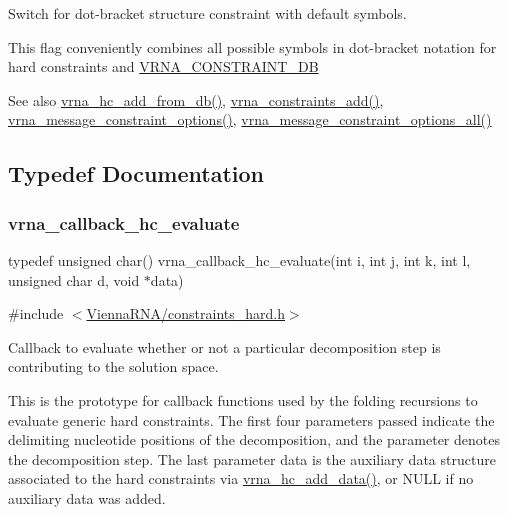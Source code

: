 Switch for dot-\/bracket structure constraint with default symbols. 

This flag conveniently combines all possible symbols in dot-\/bracket notation for hard constraints and \hyperlink{group__hard__constraints_ga4bfc2f15c4f261c62a11af9d2aa80c90}{V\+R\+N\+A\+\_\+\+C\+O\+N\+S\+T\+R\+A\+I\+N\+T\+\_\+\+DB}

\begin{DoxySeeAlso}{See also}
\hyperlink{group__hard__constraints_ga5b4de3247b67358080c176b94591a8e6}{vrna\+\_\+hc\+\_\+add\+\_\+from\+\_\+db()}, \hyperlink{group__constraints_ga35a401f680969a556858a8dd5f1d07cc}{vrna\+\_\+constraints\+\_\+add()}, \hyperlink{group__constraints_gaa1f20b53bf09ac2e6b0dbb13f7d89670}{vrna\+\_\+message\+\_\+constraint\+\_\+options()}, \hyperlink{group__constraints_gaec7e13fa0465c2acc7a621d1aecb709f}{vrna\+\_\+message\+\_\+constraint\+\_\+options\+\_\+all()} 
\end{DoxySeeAlso}


\subsection{Typedef Documentation}
\mbox{\label{group__hard__constraints_gae465f1d4a3d8b6592b38ecbb0d9f613d}} 
\subsubsection{\texorpdfstring{vrna\+\_\+callback\+\_\+hc\+\_\+evaluate}{vrna\_callback\_hc\_evaluate}}
{\footnotesize\ttfamily typedef unsigned char() vrna\+\_\+callback\+\_\+hc\+\_\+evaluate(int i, int j, int k, int l, unsigned char d, void $\ast$data)}



{\ttfamily \#include $<$\hyperlink{constraints__hard_8h}{Vienna\+R\+N\+A/constraints\+\_\+hard.\+h}$>$}



Callback to evaluate whether or not a particular decomposition step is contributing to the solution space. 

This is the prototype for callback functions used by the folding recursions to evaluate generic hard constraints. The first four parameters passed indicate the delimiting nucleotide positions of the decomposition, and the parameter {\ttfamily denotes} the decomposition step. The last parameter {\ttfamily data} is the auxiliary data structure associated to the hard constraints via \hyperlink{constraints__hard_8h_a128920e0af52e4196a9d59fa13336c7c}{vrna\+\_\+hc\+\_\+add\+\_\+data()}, or N\+U\+LL if no auxiliary data was added.

